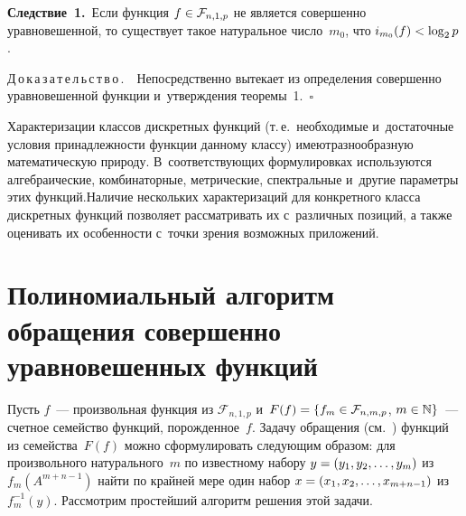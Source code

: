 \begin{multicols}{2}
\smallskip

\noindent
\textbf{Следствие~1.}\
    Если функция $f \hm\in \mathcal{F}_{n,1,p}$ не является совершенно 
уравновешенной, то существует такое натуральное число~$m_0$, что $i_{m_0} (f)\hm < 
\log_2 p$.

\smallskip

\noindent
Д\,о\,к\,а\,з\,а\,т\,е\,л\,ь\,с\,т\,в\,о\,.\ \
Непосредственно вытекает из определения совершенно уравновешенной функции и~утверждения теоремы~1.~\hfill$\square$

\smallskip

Характеризации классов дискретных функций
 (т.\,е.\ необходимые и~достаточные 
условия при\-над\-леж\-ности функции данному классу) имеют\linebreak раз\-но\-об\-раз\-ную 
математическую природу. В~соответствующих формулировках используются 
алгебраические, комбинаторные, метрические, спект\-раль\-ные и~другие параметры этих 
функций.\linebreak Наличие нескольких характеризаций для конкретного класса дискретных 
функций позволяет рассматривать их с~различных позиций, а также оценивать их 
особенности с~точки зрения возможных приложений.


\section{Полиномиальный алгоритм обращения совершенно уравновешенных функций}

Пусть $f$~--- произвольная функция из $\mathcal{F}_{n,1,p}$ 
и~$F(f)\hm=\{f_m\in\mathcal{F}_{n,m,p}$, $m\hm\in\mathbb{N}\}$~--- счетное семейство 
функций, порожденное~$f$.
Задачу обращения (см.~\cite{Goldreich}) функций из семейства~$F(f)$ можно 
сформулировать следующим образом: для произвольного натурального~$m$ по 
известному набору $y\hm=(y_1,y_2,\ldots, y_m)$ из $f_m(A^{m+n-1})$ найти по крайней 
мере один набор $x\hm=(x_1,x_2,\ldots,x_{m+n-1})$ из~$f_m^{-1}(y)$.
Рассмотрим простейший алгоритм решения этой задачи.


\end{multicols}
